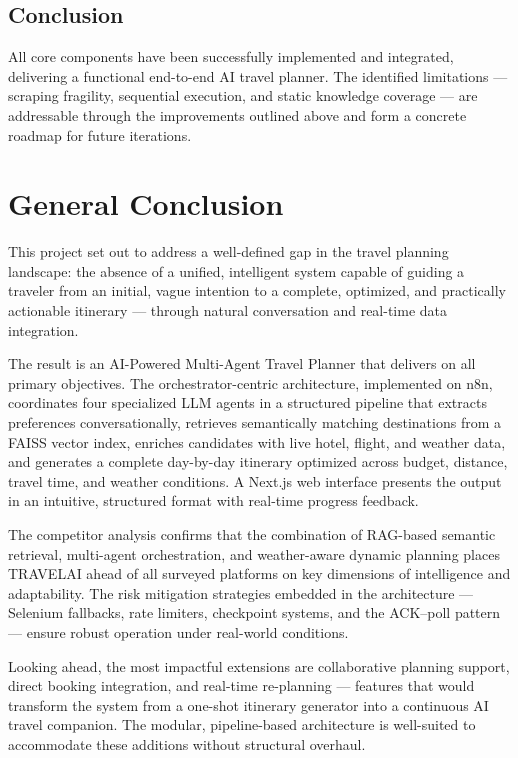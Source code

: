 \documentclass[12pt,a4paper]{report}
\begin{document}
\section*{Conclusion}

All core components have been successfully implemented and integrated, delivering a functional
end-to-end AI travel planner. The identified limitations — scraping fragility, sequential execution,
and static knowledge coverage — are addressable through the improvements outlined above and form a
concrete roadmap for future iterations.

\chapter*{General Conclusion}

This project set out to address a well-defined gap in the travel planning landscape: the absence of
a unified, intelligent system capable of guiding a traveler from an initial, vague intention to a
complete, optimized, and practically actionable itinerary — through natural conversation and
real-time data integration.

The result is an AI-Powered Multi-Agent Travel Planner that delivers on all primary objectives. The
orchestrator-centric architecture, implemented on n8n, coordinates four specialized LLM agents in a
structured pipeline that extracts preferences conversationally, retrieves semantically matching
destinations from a FAISS vector index, enriches candidates with live hotel, flight, and weather
data, and generates a complete day-by-day itinerary optimized across budget, distance, travel time,
and weather conditions. A Next.js web interface presents the output in an intuitive, structured
format with real-time progress feedback.

The competitor analysis confirms that the combination of RAG-based semantic retrieval, multi-agent
orchestration, and weather-aware dynamic planning places TRAVELAI ahead of all surveyed platforms
on key dimensions of intelligence and adaptability. The risk mitigation strategies embedded in the
architecture — Selenium fallbacks, rate limiters, checkpoint systems, and the ACK--poll pattern —
ensure robust operation under real-world conditions.

Looking ahead, the most impactful extensions are collaborative planning support, direct booking
integration, and real-time re-planning — features that would transform the system from a one-shot
itinerary generator into a continuous AI travel companion. The modular, pipeline-based architecture
is well-suited to accommodate these additions without structural overhaul.
\end{document}
